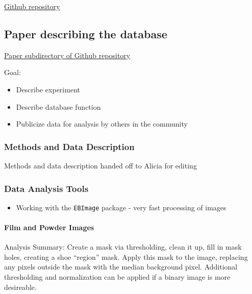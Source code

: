\documentclass[]{book}
\providecommand{\tightlist}{%
  \setlength{\itemsep}{0pt}\setlength{\parskip}{0pt}}
\let\oldparagraph\paragraph
\renewcommand{\paragraph}[1]{\oldparagraph{#1}\mbox{}}
\begin{document}
\href{https://github.com/CSAFE-ISU/Longitudinal_Shoe_Study}{Github repository}

\hypertarget{paper-describing-the-database}{%
\subsection{Paper describing the database}\label{paper-describing-the-database}}

\href{https://github.com/CSAFE-ISU/Longitudinal_Shoe_Study/tree/master/Paper}{Paper subdirectory of Github repository}

Goal:

\begin{itemize}
\tightlist
\item
  Describe experiment
\item
  Describe database function
\item
  Publicize data for analysis by others in the community
\end{itemize}

\hypertarget{lss-paper-methods}{%
\subsubsection*{Methods and Data Description}\label{lss-paper-methods}}

Methods and data description handed off to Alicia for editing

\hypertarget{lss-paper-analysis}{%
\subsubsection*{Data Analysis Tools}\label{lss-paper-analysis}}

\begin{itemize}
\tightlist
\item
  Working with the \texttt{EBImage} package - very fast processing of images
\end{itemize}

\hypertarget{lss-paper-analysis-film}{%
\paragraph{Film and Powder Images}\label{lss-paper-analysis-film}}

Analysis Summary: Create a mask via thresholding, clean it up, fill in mask holes, creating a shoe ``region'' mask. Apply this mask to the image, replacing any pixels outside the mask with the median background pixel. Additional thresholding and normalization can be applied if a binary image is more desireable.
\end{document}
